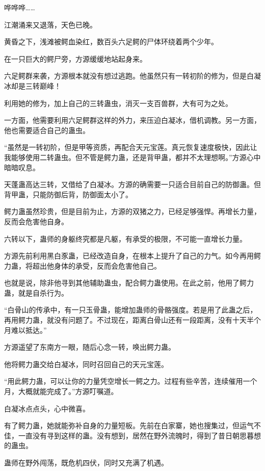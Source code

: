 
\begin{this_body}

哗哗哗……

江潮涌来又退落，天色已晚。

黄昏之下，浅滩被鳄血染红，数百头六足鳄的尸体环绕着两个少年。

在一只巨大的鳄尸旁，方源缓缓地站起身来。

六足鳄群来袭，方源根本就没有想过逃跑。他虽然只有一转初阶的修为，但是白凝冰却是三转巅峰！

利用她的修为，加上自己的三转蛊虫，消灭一支百兽群，大有可为之处。

一方面，他需要利用六足鳄群这样的外力，来压迫白凝冰，借机调教。另一方面，他也需要适合自己的蛊虫。

“虽然是一转初阶，但是甲等资质，再配合天元宝莲。真元恢复速度极快，因此让我能够使用二转蛊虫。但不管是鳄力蛊，还是背甲蛊，都并不太理想啊。”方源心中暗暗叹息。

天蓬蛊高达三转，又借给了白凝冰。方源的确需要一只适合目前自己的防御蛊。但背甲蛊，只能防御后背，防御面太小了。

鳄力蛊虽然珍贵，但是目前为止，方源的双猪之力，已经足够强悍。再增长力量，反而会危害他自身。

六转以下，蛊师的身躯终究都是凡躯，有承受的极限，不可能一直增长力量。

方源先前利用黑白豕蛊，已经改造自身，在根本上提升了自己的力气。如今再用鳄力蛊，将超出他身体的承受，反而会危害他自己。

也就是说，除非他寻到其他辅助蛊虫，配合鳄力蛊使用。在此之前，他用了鳄力蛊，就是自杀行为。

“白骨山的传承中，有一只玉骨蛊，能增加蛊师的骨骼强度。若是用了此蛊之后，再用鳄力蛊，就没有问题了。不过现在，距离白骨山还有一段距离，没有十天半个月难以抵达。”

方源遥望了东南方一眼，随后心念一转，唤出鳄力蛊。

他将鳄力蛊交给白凝冰，同时召回自己的天元宝莲。

“用此鳄力蛊，可以让你的力量凭空增长一鳄之力。过程有些辛苦，连续催用一个月，大概就能完成了。”方源叮嘱道。

白凝冰点点头，心中微喜。

有了鳄力蛊，她就能弥补自身的力量短板。先前在白家寨，她也搜集过，但运气不佳，一直没有寻到这样的蛊。没有想到，居然在野外流魄时，得到了昔日朝思暮想的蛊虫。

蛊师在野外闯荡，既危机四伏，同时又充满了机遇。


\end{this_body}
